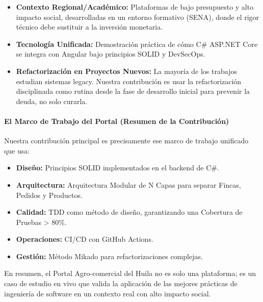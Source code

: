 \begin{itemize}
\item \textbf{Contexto Regional/Académico:} Plataformas de bajo presupuesto y alto impacto social, desarrolladas en un entorno formativo (SENA), donde el rigor técnico debe sustituir a la inversión monetaria.

\item \textbf{Tecnología Unificada:} Demostración práctica de cómo C\# ASP.NET Core se integra con Angular bajo principios SOLID y DevSecOps.

\item \textbf{Refactorización en Proyectos Nuevos:} La mayoría de los trabajos estudian sistemas legacy. Nuestra contribución es usar la refactorización disciplinada como rutina desde la fase de desarrollo inicial para prevenir la deuda, no solo curarla.
\end{itemize}

\paragraph{El Marco de Trabajo del Portal (Resumen de la Contribución)}

Nuestra contribución principal es precisamente ese marco de trabajo unificado que usa:

\begin{itemize}
\item \textbf{Diseño:} Principios SOLID implementados en el backend de C\#.

\item \textbf{Arquitectura:} Arquitectura Modular de N Capas para separar Fincas, Pedidos y Productos.

\item \textbf{Calidad:} TDD como método de diseño, garantizando una Cobertura de Pruebas > 80\%.

\item \textbf{Operaciones:} CI/CD con GitHub Actions.

\item \textbf{Gestión:} Método Mikado para refactorizaciones complejas.
\end{itemize}

En resumen, el Portal Agro-comercial del Huila no es solo una plataforma; es un caso de estudio en vivo que valida la aplicación de las mejores prácticas de ingeniería de software en un contexto real con alto impacto social.

